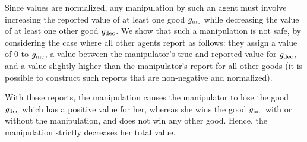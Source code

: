 \begin{proofsketch}
    Since values are normalized, any manipulation by such an agent must involve increasing the reported value of at least one good $g_{\mathrm{inc}}$ while decreasing the value of at least one other good $g_{\mathrm{dec}}$. We show that such a manipulation is not safe, by considering the case where all other agents report as follows: they assign a value of $0$ to $g_{\mathrm{inc}}$, a value between the manipulator's true and reported value for $g_{\mathrm{dec}}$, and a value slightly higher than the manipulator’s report for all other goods (it is possible to construct such reports that are non-negative and normalized). 
    
    With these reports, the manipulation causes the manipulator to lose the good $g_{\mathrm{dec}}$ which has a positive value for her, whereas   
    she wins the good $g_{\mathrm{inc}}$ with or without the manipulation, and does not win any other good. Hence, the manipulation strictly decreases her total value.
\end{proofsketch}


